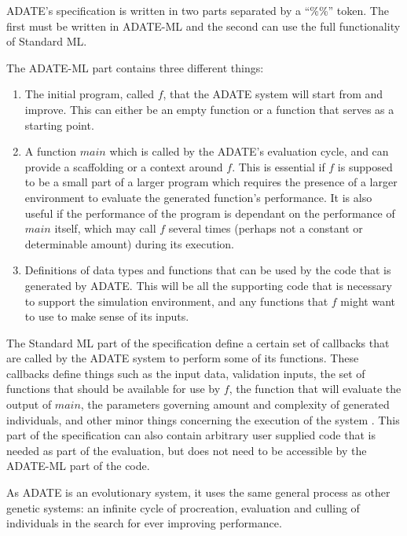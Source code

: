 ADATE's specification is written in two parts separated by a ``\%\%'' token. The
first must be written in ADATE-ML and the second can use the full functionality
of Standard ML.

The ADATE-ML part contains three different things:
\begin{enumerate}
\item The initial program, called \(f\), that the ADATE system will start from
  and improve. This can either be an empty function or a function that serves as
   a starting point.

\item A function \(main\) which is called by the ADATE's evaluation cycle, and
can provide a scaffolding or a context around \(f\). This is essential if \(f\)
is supposed to be a small part of a larger program which requires the presence
of a larger environment to evaluate the generated function's performance. It is
also useful if the performance of the program is dependant on the performance of
\(main\) itself, which may call \(f\) several times (perhaps not a constant or
determinable amount) during its execution.

\item Definitions of data types and functions that can be used by the code that
  is generated by ADATE. This will be all the supporting code that is necessary
  to support the simulation environment, and any functions that \(f\) might want
  to use to make sense of its inputs.
\end{enumerate}

The Standard ML part of the specification define a certain set of callbacks that
are called by the ADATE system to perform some of its functions. These callbacks
define things such as the input data, validation inputs, the set of functions
that should be available for use by \(f\), the function that will evaluate the
output of \(main\), the parameters governing amount and complexity of generated
individuals, and other minor things concerning the execution of the system
\citep[see][Chap.~4.2 for details]{vattekar2006adate}. This part of the
specification can also contain arbitrary user supplied code that is needed as
part of the evaluation, but does not need to be accessible by the ADATE-ML part
of the code.

As ADATE is an evolutionary system, it uses the same general process as other
genetic systems: an infinite cycle of procreation, evaluation and culling of
individuals in the search for ever improving performance.

